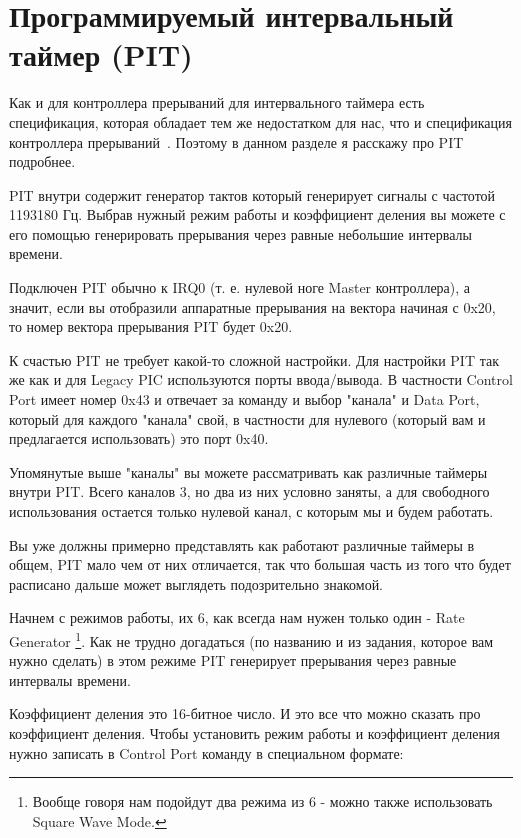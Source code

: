 \section{Программируемый интервальный таймер (PIT)}

Как и для контроллера прерываний для интервального таймера есть спецификация,
которая обладает тем же недостатком для нас, что и спецификация контроллера
прерываний~\cite{INTEL:8254DS}. Поэтому в данном разделе я расскажу про PIT
подробнее.

PIT внутри содержит генератор тактов который генерирует сигналы с частотой
1193180 Гц. Выбрав нужный режим работы и коэффициент деления вы можете с его
помощью генерировать прерывания через равные небольшие интервалы времени.

Подключен PIT обычно к IRQ0 (т. е. нулевой ноге Master контроллера), а значит,
если вы отобразили аппаратные прерывания на вектора начиная с 0x20, то номер
вектора прерывания PIT будет 0x20.

К счастью PIT не требует какой-то сложной настройки. Для настройки PIT так же
как и для Legacy PIC используются порты ввода/вывода. В частности Control Port
имеет номер 0x43 и отвечает за команду и выбор "канала" и Data Port, который для
каждого "канала" свой, в частности для нулевого (который вам и предлагается
использовать) это порт 0x40.

Упомянутые выше "каналы" вы можете рассматривать как различные таймеры внутри
PIT. Всего каналов 3, но два из них условно заняты, а для свободного
использования остается только нулевой канал, с которым мы и будем работать.

Вы уже должны примерно представлять как работают различные таймеры в общем, PIT
мало чем от них отличается, так что большая часть из того что будет расписано
дальше может выглядеть подозрительно знакомой.

Начнем с режимов работы, их 6, как всегда нам нужен только один - Rate Generator
\footnote{Вообще говоря нам подойдут два режима из 6 - можно также использовать
Square Wave Mode.}. Как не трудно догадаться (по названию и из задания, которое
вам нужно сделать) в этом режиме PIT генерирует прерывания через равные
интервалы времени.

Коэффициент деления это 16-битное число. И это все что можно сказать про
коэффициент деления. Чтобы установить режим работы и коэффициент деления нужно
записать в Control Port команду в специальном формате:

